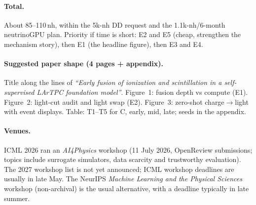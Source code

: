 \documentclass[11pt,a4paper]{article}
\begin{document}
\paragraph{Total.} About 85--110\,nh, within the 5k-nh DD request and the 1.1k-nh/6-month neutrinoGPU plan. Priority if time is short: E2 and E5 (cheap, strengthen the mechanism story), then E1 (the headline figure), then E3 and E4.

\paragraph{Suggested paper shape (4 pages + appendix).} Title along the lines of \emph{``Early fusion of ionization and scintillation in a self-supervised LArTPC foundation model''}. Figure~1: fusion depth vs compute (E1). Figure~2: light-cut audit and light swap (E2). Figure~3: zero-shot charge$\to$light with event displays. Table: T1--T5 for C, early, mid, late; seeds in the appendix.

\paragraph{Venues.} ICML 2026 ran an \emph{AI4Physics} workshop (11 July 2026, OpenReview submissions; topics include surrogate simulators, data scarcity and trustworthy evaluation). The 2027 workshop list is not yet announced; ICML workshop deadlines are usually in late May. The NeurIPS \emph{Machine Learning and the Physical Sciences} workshop (non-archival) is the usual alternative, with a deadline typically in late summer.
\end{document}
